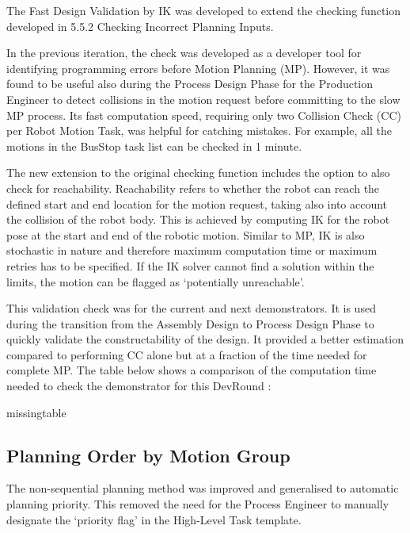 The Fast Design Validation by IK was developed to extend the checking function developed in 5.5.2 Checking Incorrect Planning Inputs. 

In the previous iteration, the check was developed as a developer tool for identifying programming errors before Motion Planning (MP). However, it was found to be useful also during the Process Design Phase for the Production Engineer to detect collisions in the motion request before committing to the slow MP process. Its fast computation speed, requiring only two Collision Check (CC) per Robot Motion Task, was helpful for catching mistakes. For example, all the motions in the BusStop task list can be checked in 1 minute. 

The new extension to the original checking function includes the option to also check for reachability. Reachability refers to whether the robot can reach the defined start and end location for the motion request, taking also into account the collision of the robot body. This is achieved by computing IK for the robot pose at the start and end of the robotic motion. Similar to MP, IK is also stochastic in nature and therefore maximum computation time or maximum retries has to be specified. If the IK solver cannot find a solution within the limits, the motion can be flagged as ‘potentially unreachable’.

This validation check was for the current and next demonstrators. It is used during the transition from the Assembly Design to Process Design Phase to quickly validate the constructability of the design. It provided a better estimation compared to performing CC alone but at a fraction of the time needed for complete MP. The table below shows a comparison of the computation time needed to check the demonstrator for this DevRound :

missingtable

\subsection{Planning Order by Motion Group}
\label{subsection:exploration_4_planning_order_by_motion_group}

The non-sequential planning method  was improved and generalised to automatic planning priority. This removed the need for the Process Engineer to manually designate the ‘priority flag’ in the High-Level Task template. 

